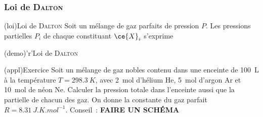 \documentclass[../../main/main.tex]{subfiles}
\begin{document}
\subsubsection{Loi de \textsc{Dalton}}
\begin{tcbraster}[raster columns=2, raster equal height=rows]
	\begin{tcb}[label=loi:dalton](loi){Loi de \textsc{Dalton}}
		Soit un mélange de gaz parfaits de pression $P$. Les pressions
		partielles $P_i$ de chaque constituant $\ce{X}_i$ s'exprime
		\csw{
			\[\boxed{P_i = x_iP}\]
		}
		\vspace{-15pt}
	\end{tcb}
	\begin{tcb}[label=demo:dalton](demo)'r'{Loi de \textsc{Dalton}}
		\csw{
			\[
				P_i =\frac{n_{g,i}RT}{V} = \xunderbracket{\frac{n_{g,i}}{n_{g,\tot}}}_{x_i}
				\times \xunderbracket{\frac{n_{g,\tot}RT}{V}}_{P}
				\Lra
				\boxed{P_i = x_iP}
				\qed
			\]
		}
	\end{tcb}
\end{tcbraster}

\begin{tcb}[breakable](appl){Exercice}
	Soit un mélange de gaz nobles contenu dans une enceinte de \SI{100}{L} à la
	température $T = \SI{298.3}{K}$, avec \SI{2}{mol} d'hélium He, \SI{5}{mol}
	d'argon Ar et \SI{10}{mol} de néon Ne.
	\smallbreak
	Calculer la pression totale dans l'enceinte aussi que la partielle de chacun
	des gaz.
	\smallbreak
	On donne la constante du gaz parfait $R = \SI{8.31}{J.K.mol^{-1}}$.
	\smallbreak
	Conseil~: \textbf{FAIRE UN SCHÉMA}
	\tcblower
	\begin{isd}
		\tcblower
	\end{isd}
\end{tcb}
\end{document}
